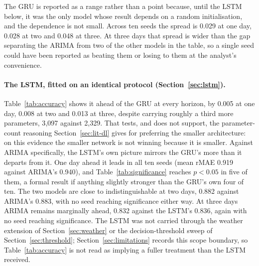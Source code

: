 \documentclass[12pt,a4paper]{report}
\begin{document}
The GRU is reported as a range rather than a point because, until the LSTM
below, it was the only model whose result depends on a random
initialisation, and the dependence is not small. Across ten seeds the
spread is 0.029 at one day, 0.028 at two and 0.048 at three. At three days
that spread is wider than the gap separating the ARIMA from two of the
other models in the table, so a single seed could have been reported as
beating them or losing to them at the analyst's convenience.

\paragraph{The LSTM, fitted on an identical protocol (Section~\ref{sec:lstm}).}
Table~\ref{tab:accuracy} shows it ahead of the GRU at every horizon, by 0.005 at one day, 0.008 at two and 0.013 at three, despite carrying roughly a third more parameters, 3{,}097 against 2{,}329. That tests, and does not support, the parameter-count reasoning Section~\ref{sec:lit-dl} gives for preferring the smaller architecture: on this evidence the smaller network is not winning because it is smaller. Against ARIMA specifically, the LSTM's own picture mirrors the GRU's more than it departs from it. One day ahead it leads in all ten seeds (mean rMAE 0.919 against ARIMA's 0.940), and Table~\ref{tab:significance} reaches $p<0.05$ in five of them, a formal result if anything slightly stronger than the GRU's own four of ten. The two models are close to indistinguishable at two days, 0.882 against ARIMA's 0.883, with no seed reaching significance either way. At three days ARIMA remains marginally ahead, 0.832 against the LSTM's 0.836, again with no seed reaching significance. The LSTM was not carried through the weather extension of Section~\ref{sec:weather} or the decision-threshold sweep of Section~\ref{sec:threshold}; Section~\ref{sec:limitations} records this scope boundary, so Table~\ref{tab:accuracy} is not read as implying a fuller treatment than the LSTM received.
\end{document}
